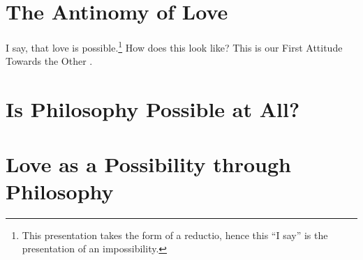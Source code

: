 \section{The Antinomy of Love}

I say, that love is possible.\footnote{This presentation takes the form of a reductio, hence this \enquote{I say} is the presentation of an impossibility.} How does this look like? This is our First Attitude Towards the Other \autocite[482]{Sartre}.


\section{Is Philosophy Possible at All?}

\section{Love as a Possibility through Philosophy}
